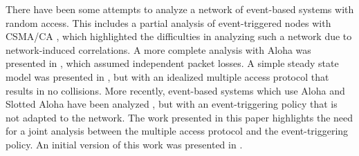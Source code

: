 \documentclass[journal]{IEEEtran}
\begin{document}
There have been some attempts to analyze a network of event-based systems with random access. This includes a partial analysis of event-triggered nodes with CSMA/CA \cite{Cervin2008}, which highlighted the difficulties in analyzing such a network due to network-induced correlations. A more complete analysis with Aloha was presented in \cite{Rabi2009}, which assumed independent packet losses. A simple steady state model was presented in \cite{Henningsson2010}, but with an idealized multiple access protocol that results in no collisions. More recently, event-based systems which use Aloha and Slotted Aloha have been analyzed \cite{Blind2011a}, but with an event-triggering policy that is not adapted to the network. The work presented in this paper highlights the need for a joint analysis between the multiple access protocol and the event-triggering policy. An initial version of this work was presented in \cite{Ramesh2011b}.
\end{document}
